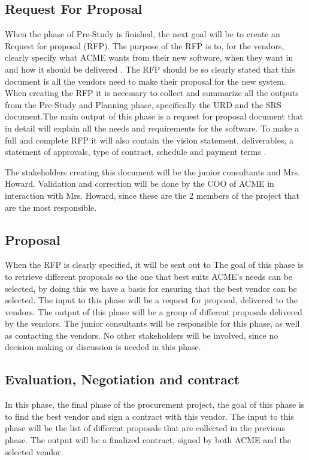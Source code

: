 \documentclass[a4paper]{article}
\begin{document}
\subsection{Request For Proposal}
\label{sub:request_for_propsal}
When the phase of Pre-Study is finished, the next goal will be to create an Request for proposal (RFP). The purpose of the RFP is to, for the vendors, clearly specify what ACME wants from their new software, when they want in and how it should be delivered \cite{SPM34}. The RFP should be so clearly stated that this document is all the vendors need to make their proposal for the new system. 
When creating the RFP it is necessary to collect and summarize all the outputs from the Pre-Study and Planning phase, specifically the URD and the SRS document.The main output of this phase is a request for proposal document that in detail will explain all the needs and requirements for the software. To make a full and complete RFP it will also contain the vision statement, deliverables, a statement of approvals, type of contract, schedule and payment terms \cite{SPM3536}.

The stakeholders creating this document will be the junior consultants and Mrs. Howard. Validation and correction will be done by the COO of ACME in interaction with Mrs. Howard, since these are the 2 members of the project that are the most responsible.

\subsection{Proposal}
\label{sub:proposal}
When the RFP is clearly specified, it will be sent out to 
The goal of this phase is to retrieve different proposals so the one that best suits ACME's needs can be selected, by doing this we have a basis for ensuring that the best vendor can be selected. The input to this phase will be a request for proposal, delivered to the vendors. The output of this phase will be a group of different proposals delivered by the vendors. The junior consultants will be responsible for this phase, as well as contacting the vendors. No other stakeholders will be involved, since no decision making or discussion is needed in this phase.

\subsection{Evaluation, Negotiation and contract}
\label{sub:evaluation_negotiation_and_contract}
In this phase, the final phase of the procurement project, the goal of this phase is to find the best vendor and sign a contract with this vendor. The input to this phase will be the list of different proposals that are collected in the previous phase. The output will be a finalized contract, signed by both ACME and the selected vendor. 
\end{document}

